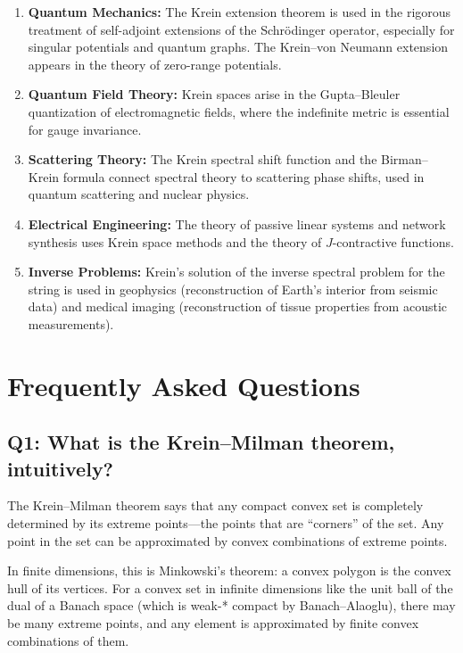 \begin{enumerate}
    \item \textbf{Quantum Mechanics:} The Krein extension theorem is used in the rigorous treatment of self-adjoint extensions of the Schr\"{o}dinger operator, especially for singular potentials and quantum graphs. The Krein--von Neumann extension appears in the theory of zero-range potentials.
    
    \item \textbf{Quantum Field Theory:} Krein spaces arise in the Gupta--Bleuler quantization of electromagnetic fields, where the indefinite metric is essential for gauge invariance.
    
    \item \textbf{Scattering Theory:} The Krein spectral shift function and the Birman--Krein formula connect spectral theory to scattering phase shifts, used in quantum scattering and nuclear physics.
    
    \item \textbf{Electrical Engineering:} The theory of passive linear systems and network synthesis uses Krein space methods and the theory of $J$-contractive functions.
    
    \item \textbf{Inverse Problems:} Krein's solution of the inverse spectral problem for the string is used in geophysics (reconstruction of Earth's interior from seismic data) and medical imaging (reconstruction of tissue properties from acoustic measurements).
\end{enumerate}

\section{Frequently Asked Questions}

\subsection*{Q1: What is the Krein--Milman theorem, intuitively?}

The Krein--Milman theorem says that any compact convex set is completely determined by its extreme points---the points that are ``corners'' of the set. Any point in the set can be approximated by convex combinations of extreme points.

In finite dimensions, this is Minkowski's theorem: a convex polygon is the convex hull of its vertices. For a convex set in infinite dimensions like the unit ball of the dual of a Banach space (which is weak-* compact by Banach--Alaoglu), there may be many extreme points, and any element is approximated by finite convex combinations of them.

